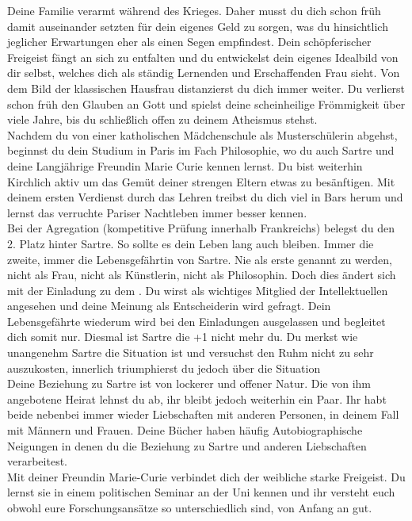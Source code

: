 \documentclass[12pt, a4paper, openany]{report}
\begin{document}
Deine Familie verarmt während des Krieges. Daher musst du dich schon früh damit auseinander setzten für dein eigenes Geld zu sorgen, was du hinsichtlich jeglicher Erwartungen eher als einen Segen empfindest. Dein schöpferischer Freigeist fängt an sich zu entfalten und du entwickelst dein eigenes Idealbild von dir selbst, welches dich als ständig Lernenden und Erschaffenden Frau sieht. Von dem Bild der klassischen Hausfrau distanzierst du dich immer weiter. Du verlierst schon früh den Glauben an Gott und spielst deine scheinheilige Frömmigkeit über viele Jahre, bis du schließlich offen zu deinem Atheismus stehst. \\

Nachdem du von einer katholischen Mädchenschule als Musterschülerin abgehst, beginnst du dein Studium in Paris im Fach Philosophie, wo du auch Sartre und deine Langjährige Freundin Marie Curie kennen lernst. Du bist weiterhin Kirchlich aktiv um das Gemüt deiner strengen Eltern etwas zu besänftigen. Mit deinem ersten Verdienst durch das Lehren treibst du dich viel in Bars herum und lernst das verruchte Pariser Nachtleben immer besser kennen. \\

Bei der Agregation (kompetitive Prüfung innerhalb Frankreichs) belegst du den 2. Platz hinter Sartre. So sollte es dein Leben lang auch bleiben. Immer die zweite, immer die Lebensgefährtin von Sartre. Nie als erste genannt zu werden, nicht als Frau, nicht als Künstlerin, nicht als Philosophin. Doch dies ändert sich mit der Einladung zu dem . Du wirst als wichtiges Mitglied der Intellektuellen angesehen und deine Meinung als Entscheiderin wird gefragt. Dein Lebensgefährte wiederum wird bei den Einladungen ausgelassen und begleitet dich somit nur. Diesmal ist Sartre die +1 nicht mehr du. Du merkst wie unangenehm Sartre die Situation ist und versuchst den Ruhm nicht zu sehr auszukosten, innerlich triumphierst du jedoch über die Situation \\

Deine Beziehung zu Sartre ist von lockerer und offener Natur. Die von ihm angebotene Heirat lehnst du ab, ihr bleibt jedoch weiterhin ein Paar. Ihr habt beide nebenbei immer wieder Liebschaften mit anderen Personen, in deinem Fall mit Männern und Frauen. Deine Bücher haben häufig Autobiographische Neigungen in denen du die Beziehung zu Sartre und anderen Liebschaften verarbeitest. \\

Mit deiner Freundin Marie-Curie verbindet dich der weibliche starke Freigeist. Du lernst sie in einem politischen Seminar an der Uni kennen und ihr versteht euch obwohl eure Forschungsansätze so unterschiedlich sind, von Anfang an gut.  
\end{document}
